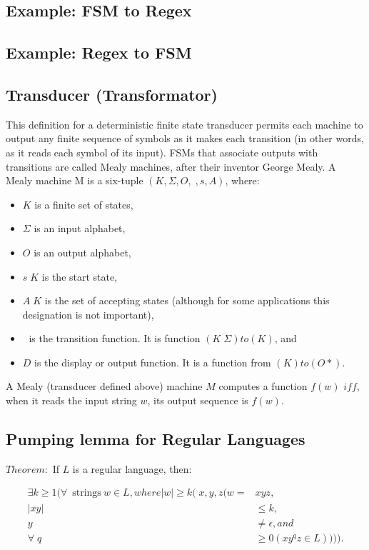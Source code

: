 \documentclass{article}
\begin{document}
\subsection{Example: FSM to Regex}

\subsection{Example: Regex to FSM}


\subsection{Transducer (Transformator)}

This definition for a deterministic finite state transducer permits each
machine to output any finite sequence of symbols as it makes each transition
(in other words, as it reads each symbol of its input).  FSMs that associate
outputs with transitions are called Mealy machines, after their inventor George
Mealy.  A Mealy machine M is a six-tuple $(K, \Sigma, O, , s, A)$, where: 

\begin{itemize}
	\item $K$ is a finite set of states,
	\item $\Sigma$ is an input alphabet,
	\item $O$ is an output alphabet,
	\item $s  K$ is the start state,
	\item $A  K$ is the set of accepting states (although for some
			applications this designation is not important),
	\item $$ is the transition function. It is function $(K  \Sigma) to (K)$, and
	\item $D$ is the display or output function. It is a function from $(K) to (O*)$.
\end{itemize}

A Mealy (transducer defined above) machine $M$ computes a function $f(w)$ $
iff$, when it reads the input string $w$, its output sequence is $f(w)$. 

\subsection{Pumping lemma for Regular Languages }

$Theorem:$ If $L$ is a regular language, then: 

\begin{align*}
		\exists k \ge 1 ( \forall \>\text{strings} \> w \in L, where |w| \ge k (x, y, z (w = &xyz, \\
		 |xy| &\le k, \\
		 y &\ne \epsilon, and \\
		\forallq &\ge 0 (xy^{q}z \in L)))). \\
\end{align*}
 
\end{document}
